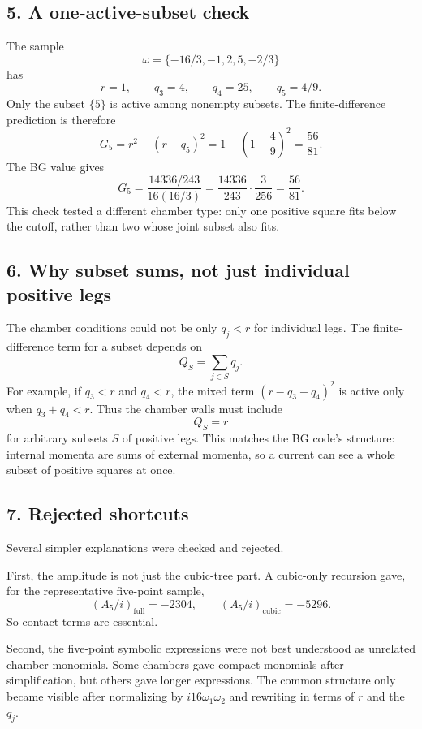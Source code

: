 \documentclass[11pt]{article}
\begin{document}
\subsection*{5. A one-active-subset check}

The sample
\[
    \omega=\{-16/3,-1,2,5,-2/3\}
\]
has
\[
    r=1,\qquad q_3=4,\qquad q_4=25,\qquad q_5=4/9.
\]
Only the subset \(\{5\}\) is active among nonempty subsets. The finite-difference
prediction is therefore
\[
    G_5=r^2-(r-q_5)^2
    =
    1-\left(1-\frac49\right)^2
    =
    \frac{56}{81}.
\]
The BG value gives
\[
    G_5
    =
    \frac{14336/243}{16(16/3)}
    =
    \frac{14336}{243}\cdot\frac{3}{256}
    =
    \frac{56}{81}.
\]
This check tested a different chamber type: only one positive square fits below
the cutoff, rather than two whose joint subset also fits.

\subsection*{6. Why subset sums, not just individual positive legs}

The chamber conditions could not be only \(q_j<r\) for individual legs. The
finite-difference term for a subset depends on
\[
    Q_S=\sum_{j\in S}q_j.
\]
For example, if \(q_3<r\) and \(q_4<r\), the mixed term \((r-q_3-q_4)^2\) is
active only when \(q_3+q_4<r\). Thus the chamber walls must include
\[
    Q_S=r
\]
for arbitrary subsets \(S\) of positive legs. This matches the BG code's
structure: internal momenta are sums of external momenta, so a current can see a
whole subset of positive squares at once.

\subsection*{7. Rejected shortcuts}

Several simpler explanations were checked and rejected.

First, the amplitude is not just the cubic-tree part. A cubic-only recursion
gave, for the representative five-point sample,
\[
    (A_5/i)_{\mathrm{full}}=-2304,
    \qquad
    (A_5/i)_{\mathrm{cubic}}=-5296.
\]
So contact terms are essential.

Second, the five-point symbolic expressions were not best understood as
unrelated chamber monomials. Some chambers gave compact monomials after
simplification, but others gave longer expressions. The common structure only
became visible after normalizing by \(i16\omega_1\omega_2\) and rewriting in
terms of \(r\) and the \(q_j\).
\end{document}
